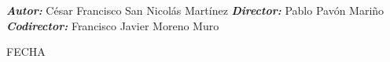 \documentclass[
11pt, %
spanish, %
singlespacing, %
parskip, %
headsepline, %
]{MastersDoctoralThesis} %
\let\\\space%
\begin{document}
\begin{titlepage}
\begin{flushleft}
		\begin{large}
              \textit{\textbf{Autor:}} César Francisco San Nicolás Martínez\\
			  \textit{\textbf{Director:}} Pablo Pavón Mariño\\
			  \textit{\textbf{Codirector:}} Francisco Javier Moreno Muro\\
		\end{large}
	\end{flushleft}
	\vspace*{0.7in}
	\begin{center}
		FECHA\\
	\end{center}
    \vfill
	
\end{titlepage}
\restoregeometry
\cleardoublepage
\end{document}
